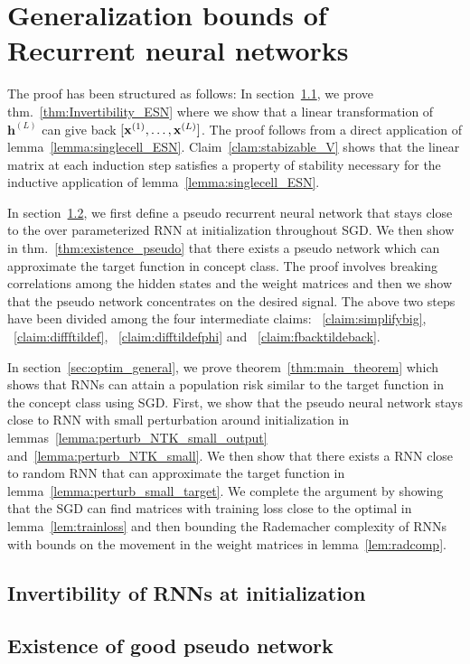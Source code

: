 \section{Generalization bounds of Recurrent neural networks}\label{sec:maingensec}
The proof has been structured as follows: In section~\ref{sec:Invert_RNN}, we prove thm.~\ref{thm:Invertibility_ESN} where we show that a linear transformation of $\mathbf{h}^{(L)}$ can give back $[\mathbf{x}^{(1)}, \ldots, \mathbf{x}^{(L)}]$. The proof follows from a direct application of lemma~\ref{lemma:singlecell_ESN}. Claim~\ref{clam:stabizable_V} shows that the linear matrix at each induction step satisfies a property of stability necessary for the inductive application of lemma~\ref{lemma:singlecell_ESN}.  

In section~\ref{sec:existence}, we first define a pseudo recurrent neural network that stays close to the over parameterized RNN at initialization throughout SGD. We then show in thm.~\ref{thm:existence_pseudo} that there exists a pseudo network which can approximate the target function in concept class. The proof involves breaking correlations among the hidden states and the weight matrices and then we show that the pseudo network concentrates on the desired signal. The above two steps have been divided among the four intermediate claims: ~\ref{claim:simplifybig}, ~\ref{claim:diffftildef}, ~\ref{claim:difftildefphi} and ~\ref{claim:fbacktildeback}.

In section~\ref{sec:optim_general}, we prove theorem~\ref{thm:main_theorem} which shows that RNNs can attain a population risk similar to the target function in the concept class using SGD. First, we show that the pseudo neural network stays close to RNN with small perturbation around initialization in lemmas~\ref{lemma:perturb_NTK_small_output} and~\ref{lemma:perturb_NTK_small}. We then show that there exists a RNN close to random RNN that can approximate the target function in lemma~\ref{lemma:perturb_small_target}. We complete the argument by showing that the SGD can find matrices with training loss close to the optimal in lemma~\ref{lem:trainloss} and then bounding the Rademacher complexity of RNNs with bounds on the movement in the weight matrices in lemma~\ref{lem:radcomp}.


    

    \subsection{Invertibility of RNNs at initialization}\label{sec:Invert_RNN}    
    
    
   
    \subsection{Existence of good pseudo network}\label{sec:existence}
    


